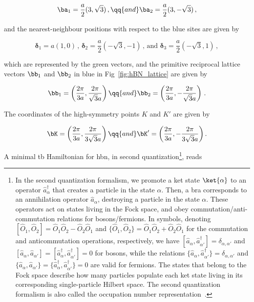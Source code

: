 \begin{equation}
    \ba_1 = \frac{a}{2}(3,\sqrt{3})\,, \qq{and} \ba_2 = \frac{a}{2}(3,-\sqrt{3})\,,
\end{equation}

\noindent and the nearest-neighbour positions with respect to the blue sites are given by

\begin{equation}
    \boldsymbol{\delta}_1 = a(1,0)\,, \, \boldsymbol{\delta}_2 = \frac{a}{2}(-\sqrt{3},-1)\,,\,\text{and}\,\, \boldsymbol{\delta}_3 = \frac{a}{2}(-\sqrt{3},1)\,,
    \label{eq:delta_vectors}
\end{equation}

\noindent which are represented by the green vectors, and the primitive reciprocal lattice vectors $\bb_1$ and $\bb_2$ in blue in Fig~\ref{fig:hBN_lattice} are given by

\begin{equation}
    \bb_1 = \left(\frac{2 \pi}{3 a},\frac{2 \pi}{\sqrt{3} a} \right) \qq{and} \bb_2 = \left(\frac{2 \pi}{3 a},-\frac{2 \pi}{\sqrt{3} a} \right)\,.
\end{equation}

\noindent The coordinates of the high-symmetry points $K$ and $K'$ are given by

\begin{equation}
    \bK = \left(\frac{2 \pi}{3 a},\frac{2 \pi}{3\sqrt{3} a} \right) \qq{and} \bK' = \left(\frac{2 \pi}{3 a},-\frac{2 \pi}{3\sqrt{3} a} \right).
\end{equation}

A minimal \gls{tb} Hamiltonian for \gls{hbn}, in second quantization\footnote{In the second quantization formalism, we promote a ket state $\ket{\alpha}$ to an operator $\hat{a}_{\alpha}^{\dagger}$ that creates a particle in the state $\alpha$. Then, a bra corresponds to an annihilation operator $\hat{a}_{\alpha}$, destroying a particle in the state $\alpha$. These operators act on states living in the Fock space, and obey commutation/anti-commutation relations for bosons/fermions. In symbols, denoting $[\hat{O}_1,\hat{O}_2] = \hat{O}_1 \hat{O}_2 - \hat{O}_2\hat{O}_1$ and $\{\hat{O}_1,\hat{O}_2\} =  \hat{O}_1 \hat{O}_2 + \hat{O}_2\hat{O}_1$ for the commutation and anticommutation operations, respectively, we have $[\hat{a}_{\alpha},\hat{a}_{\alpha'}^{\dagger}] = \delta_{\alpha,\alpha'}$ and $[\hat{a}_{\alpha},\hat{a}_{\alpha'}] = [\hat{a}_{\alpha}^{\dagger},\hat{a}_{\alpha'}^{\dagger}] = 0$ for bosons, while the relations $\{\hat{a}_{\alpha},\hat{a}_{\alpha'}^{\dagger}\} = \delta_{\alpha,\alpha'}$ and $\{\hat{a}_{\alpha},\hat{a}_{\alpha'}\} = \{\hat{a}_{\alpha}^{\dagger},\hat{a}_{\alpha'}^{\dagger}\} = 0$ are valid for fermions. The states that belong to the Fock space describe how many particles populate each ket state living in its corresponding single-particle Hilbert space. The second quantization formalism is also called the occupation number representation~\cite{Fetter_Walecka}.\label{fn:second_quantization_definitions}}, reads

